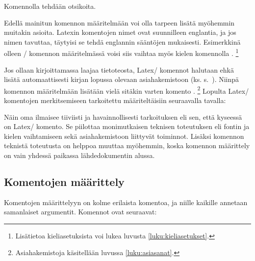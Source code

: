 \begin{tulossis}
  Komennolla  tehdään otsikoita.
\end{tulossis}

Edellä mainitun komennon määritelmään voi olla tarpeen lisätä myöhemmin
muitakin asioita. Latexin komentojen nimet ovat suunnilleen englantia,
ja jos nimen tavuttaa, täytyisi se tehdä englannin sääntöjen mukaisesti.
Esimerkkinä olleen \-/ komennon määritelmässä voisi
siis vaihtaa myös kielen komennolla .%
\footnote{Lisätietoa kieliasetuksista voi lukea luvusta
  \ref{luku:kieliasetukset}.}

Jos ollaan kirjoittamassa laajaa tietoteosta, Latex\-/ komennot halutaan
ehkä lisätä automaattisesti kirjan lopussa olevaan asiahakemistoon (ks.
s.~\pageref{luku:asiahakemisto}). Niinpä komennon määritelmään lisätään
vielä sitäkin varten komento .%
\footnote{Asiahakemistoja käsitellään luvussa \ref{luku:asiasanat}.}
Lopulta Latex\-/ komentojen merkitsemiseen tarkoitettu
 määriteltäisiin seuraavalla tavalla:

\begin{koodilohkosis}
\newcommand{\komento}[1]{%
  \texttt{\textbackslash\textenglish{#1}}%
  \index[komennot]{\texttt{\textbackslash #1}}}
\end{koodilohkosis}

Näin oma  ilmaisee tiiviisti ja havainnollisesti
tarkoituksen eli sen, että kyseessä on Latex\-/ komento. Se piilottaa
monimutkaisen teknisen toteutuksen eli fontin ja kielen vaihtamiseen
sekä asiahakemistoon liittyvät toiminnot. Lisäksi komennon teknistä
toteutusta on helppoa muuttaa myöhemmin, koska komennon määrittely on
vain yhdessä paikassa lähdedokumentin alussa.

\subsection{Komentojen määrittely}
\label{luku:komennot_maarittely}

Komentojen määrittelyyn on kolme erilaista komentoa, ja niille kaikille
annetaan samanlaiset argumentit. Komennot ovat seuraavat:

\begin{koodilohkosis}
\newcommand     {\nimi}[n][oletus]{määritelmä}
\renewcommand   {\nimi}[n][oletus]{määritelmä}
\providecommand {\nimi}[n][oletus]{määritelmä}
\end{koodilohkosis}


